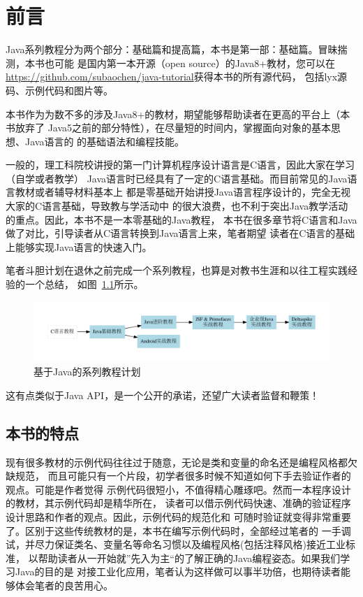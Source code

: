\frontmatter
\chapter{前言}
Java系列教程分为两个部分：基础篇和提高篇，本书是第一部：基础篇。冒昧揣测，本书也可能
是国内第一本开源（open source）的Java8+教材，您可以在
\url{https://github.com/subaochen/java-tutorial}获得本书的所有源代码，
包括lyx源码、示例代码和图片等。

本书作为为数不多的涉及Java8+的教材，期望能够帮助读者在更高的平台上（本书放弃了
Java5之前的部分特性），在尽量短的时间内，掌握面向对象的基本思想、Java语言的
的基础语法和编程技能。

一般的，理工科院校讲授的第一门计算机程序设计语言是C语言，因此大家在学习（自学或者教学）
Java语言时已经具有了一定的C语言基础。而目前常见的Java语言教材或者辅导材料基本上
都是零基础开始讲授Java语言程序设计的，完全无视大家的C语言基础，导致教与学活动中
的很大浪费，也不利于突出Java教学活动的重点。因此，本书不是一本零基础的Java教程，
本书在很多章节将C语言和Java做了对比，引导读者从C语言转换到Java语言上来，笔者期望
读者在C语言的基础上能够实现Java语言的快速入门。

笔者斗胆计划在退休之前完成一个系列教程，也算是对教书生涯和以往工程实践经验的一个总结，
如图~\ref{fig:tutorial-plan}所示。

\begin{figure}
    \centering
    \includegraphics[width=\textwidth]{imgs/frontmatter/tutorials-plan}
    \caption{基于Java的系列教程计划}
    \label{fig:tutorial-plan}
\end{figure}

这有点类似于Java API，是一个公开的承诺，还望广大读者监督和鞭策！

\section*{本书的特点}
现有很多教材的示例代码往往过于随意，无论是类和变量的命名还是编程风格都欠缺规范，
而且可能只有一个片段，初学者很多时候不知道如何下手去验证作者的观点。可能是作者觉得
示例代码很短小，不值得精心雕琢吧。然而一本程序设计的教材，其示例代码却是精华所在，
读者可以借示例代码快速、准确的验证程序设计思路和作者的观点。因此，示例代码的规范化和
可随时验证就变得非常重要了。区别于这些传统教材的是，本书在编写示例代码时，全部经过笔者的
一手调试，并尽力保证类名、变量名等命名习惯以及编程风格(包括注释风格)接近工业标准，
以帮助读者从一开始就”先入为主“的了解正确的Java编程姿态。如果我们学习Java的目的是
对接工业化应用，笔者认为这样做可以事半功倍，也期待读者能够体会笔者的良苦用心。

